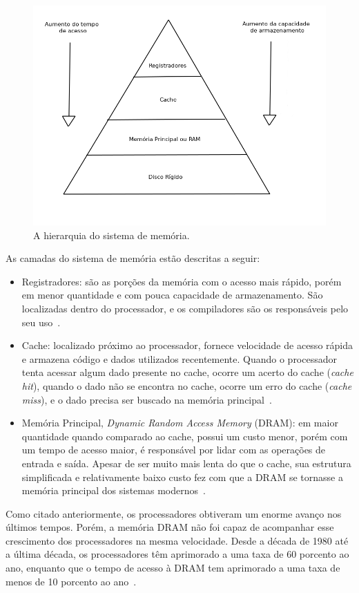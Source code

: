 \documentclass[11pt]{article}
\begin{document}
\begin{figure}[h!]
    \centering
    \includegraphics[width =.6\textwidth]{figuras/memoryhierarchy}
    \caption{A hierarquia do sistema de memória.}
    \label{memhier}
\end{figure}

As camadas do sistema de memória estão descritas a seguir: 

\begin{itemize}
    \item Registradores: são as porções da memória com o acesso mais rápido, porém em menor quantidade e com 
        pouca capacidade de armazenamento. São localizadas dentro do processador, e os compiladores são os responsáveis 
        pelo seu uso~\cite{Clements:2006:PCH:1214951}.
    \item Cache: localizado próximo ao processador, fornece velocidade de acesso rápida e armazena código e dados utilizados 
        recentemente. Quando o processador tenta acessar algum dado presente no cache, ocorre um acerto do cache 
        (\textit{cache hit}), quando o dado não se encontra no cache, ocorre um erro do cache (\textit{cache miss}), e o dado 
        precisa ser buscado na memória principal~\cite{Mahapatra:1999:PBP:357783.331677}.
    \item Memória Principal, \textit{Dynamic Random Access Memory} (DRAM): em maior quantidade quando comparado ao cache,
        possui um custo menor, porém com um tempo de acesso 
        maior, é responsável por lidar com as operações de entrada e saída. Apesar de ser muito mais lenta do que o cache, sua 
        estrutura simplificada e relativamente baixo custo fez com que a DRAM se tornasse a memória principal dos sistemas 
        modernos~\cite{Mahapatra:1999:PBP:357783.331677}.
\end{itemize}

Como citado anteriormente, os processadores obtiveram um enorme avanço nos últimos tempos. Porém, a memória DRAM não foi 
capaz de acompanhar esse crescimento dos processadores na mesma velocidade. Desde a década de 1980 até a última década, os 
processadores têm aprimorado a uma taxa de 60 porcento ao ano, enquanto que o tempo de acesso à DRAM tem aprimorado a uma 
taxa de menos de 10 porcento ao ano~\cite{Patterson:1997:CIR:623274.624083}.
\end{document}
